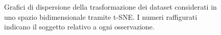 \documentclass[12pt,italian]{report}
\begin{document}
\begin{figure}
	\centering
	\caption{Grafici di dispersione della trasformazione dei dataset considerati in uno spazio bidimensionale tramite t-SNE. I numeri raffigurati indicano il soggetto relativo a ogni osservazione.}
	\label{fig:tsne_2d}
\end{figure}
\end{document}
